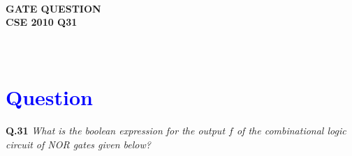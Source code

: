 \documentclass[a4paper,12pt]{article}
\begin{document}
\pagestyle{empty} %

\thispagestyle{fancy} %
\fancyhf{} %
\renewcommand{\headrulewidth}{0pt} %


\vspace{1cm}
\begin{center}

    {\LARGE \textbf{\textcolor{darkskyblue}{\\  GATE QUESTION \\ CSE 2010 Q31}}}
\end{center}

\vspace{-1cm} %
\section*{\textcolor{blue}{\\Question}}

\noindent
\textbf{Q.31} \textit{What is the boolean expression for the output $f$ of the combinational logic circuit of NOR gates given below?}

\vspace{1cm}
\end{document}
